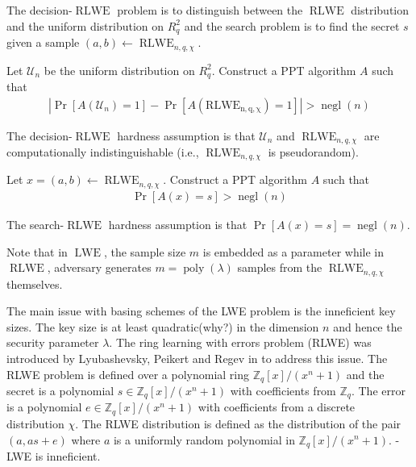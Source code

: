 The decision-$\operatorname{RLWE}$ problem is to distinguish between the $\operatorname{RLWE}$ distribution and the uniform distribution on $R_q^2$ and the search problem is to find the secret $s$ given a sample $(a,b) \leftarrow \operatorname{RLWE}_{n,q,\chi}$.
\begin{definition}
    Let $\mathcal{U}_n$ be the uniform distribution on $R_q^2$. Construct a PPT algorithm $A$ such that 
    \begin{equation*}
        \begin{aligned}
        |\operatorname{Pr}[A(\mathcal{U}_n) = 1] - \operatorname{Pr}[A(\operatorname{RLWE_{n,q,\chi}}) = 1]| > \operatorname{negl}(n)
        \end{aligned}
    \end{equation*}
\end{definition}
The decision-$\operatorname{RLWE}$ hardness assumption is that $\mathcal{U}_n$ and $\operatorname{RLWE}_{n,q,\chi}$ are computationally indistinguishable (i.e., $\operatorname{RLWE}_{n,q,\chi}$ is pseudorandom).
\begin{definition}
    Let $x = (a, b) \leftarrow \operatorname{RLWE}_{n,q,\chi}$. Construct a PPT algorithm $A$ such that 
    \begin{equation*}
        \begin{aligned}
            \operatorname{Pr}[A(x) = s] > \operatorname{negl}(n)
        \end{aligned}
    \end{equation*}
\end{definition}
The search-$\operatorname{RLWE}$ hardness assumption is that $\operatorname{Pr}[A(x) = s] = \operatorname{negl}(n)$.

Note that in $\operatorname{LWE}$, the sample size $m$ is embedded as a parameter while in $\operatorname{RLWE}$, adversary generates $m = \operatorname{poly}(\lambda)$ samples from the $\operatorname{RLWE}_{n,q,\chi}$ themselves.



The main issue with basing schemes of the LWE problem is the inneficient key sizes. The key size is at least quadratic(why?) in the dimension $n$ and hence the security parameter $\lambda$. The ring learning with errors problem (RLWE) was introduced by Lyubashevsky, Peikert and Regev in \cite{RLWE} to address this issue. The RLWE problem is defined over a polynomial ring $\mathbb{Z}_q[x]/(x^n+1)$ and the secret is a polynomial $s \in \mathbb{Z}_q[x]/(x^n+1)$ with coefficients from $\mathbb{Z}_q$. The error is a polynomial $e \in \mathbb{Z}_q[x]/(x^n+1)$ with coefficients from a discrete distribution $\chi$. The RLWE distribution is defined as the distribution of the pair $(a, as+e)$ where $a$ is a uniformly random polynomial in $\mathbb{Z}_q[x]/(x^n+1)$.
- LWE is inneficient. 


